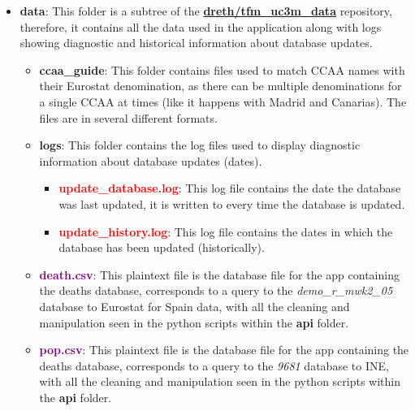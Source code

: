 \documentclass[
  a4paper]{article}
\providecommand{\tightlist}{%
  \setlength{\itemsep}{0pt}\setlength{\parskip}{0pt}}
\begin{document}
\begin{itemize}
\tightlist
\item
  \textcolor{darkspringgreen}{\textbf{data}}: This folder is a subtree
  of the
  \href{https://github.com/dreth/tfm_c3m_data}{\textbf{dreth/tfm\_uc3m\_data}}
  repository, therefore, it contains all the data used in the
  application along with logs showing diagnostic and historical
  information about database updates.

  \begin{itemize}
  \tightlist
  \item
    \textcolor{darkspringgreen}{\textbf{ccaa\_guide}}: This folder
    contains files used to match CCAA names with their Eurostat
    denomination, as there can be multiple denominations for a single
    CCAA at times (like it happens with Madrid and Canarias). The files
    are in several different formats.
  \item
    \textcolor{darkspringgreen}{\textbf{logs}}: This folder contains the
    log files used to display diagnostic information about database
    updates (dates).

    \begin{itemize}
    \tightlist
    \item
      \textcolor{red}{\textbf{update\_database.log}}: This log file
      contains the date the database was last updated, it is written to
      every time the database is updated.
    \item
      \textcolor{red}{\textbf{update\_history.log}}: This log file
      contains the dates in which the database has been updated
      (historically).
    \end{itemize}
  \item
    \textcolor{purple}{\textbf{death.csv}}: This plaintext file is the
    database file for the app containing the deaths database,
    corresponds to a query to the \emph{demo\_r\_mwk2\_05} database to
    Eurostat for Spain data, with all the cleaning and manipulation seen
    in the python scripts within the
    \textcolor{darkspringgreen}{\textbf{api}} folder.
  \item
    \textcolor{purple}{\textbf{pop.csv}}: This plaintext file is the
    database file for the app containing the deaths database,
    corresponds to a query to the \emph{9681} database to INE, with all
    the cleaning and manipulation seen in the python scripts within the
    \textcolor{darkspringgreen}{\textbf{api}} folder.
  \end{itemize}
\end{itemize}
\end{document}
